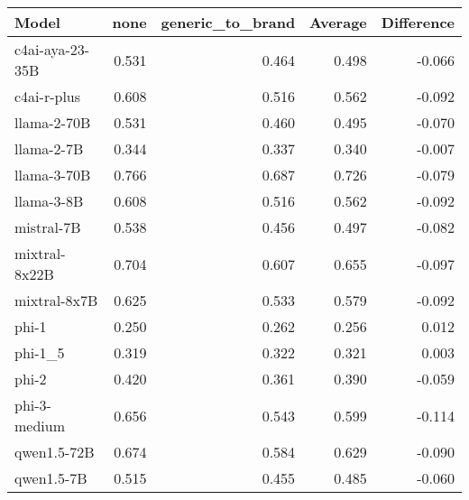 \begin{tabular}{lrrrr}
\toprule
Model & none & generic_to_brand & Average & Difference \\
\midrule
c4ai-aya-23-35B & 0.531 & 0.464 & 0.498 & -0.066 \\
c4ai-r-plus & 0.608 & 0.516 & 0.562 & -0.092 \\
llama-2-70B & 0.531 & 0.460 & 0.495 & -0.070 \\
llama-2-7B & 0.344 & 0.337 & 0.340 & -0.007 \\
llama-3-70B & 0.766 & 0.687 & 0.726 & -0.079 \\
llama-3-8B & 0.608 & 0.516 & 0.562 & -0.092 \\
mistral-7B & 0.538 & 0.456 & 0.497 & -0.082 \\
mixtral-8x22B & 0.704 & 0.607 & 0.655 & -0.097 \\
mixtral-8x7B & 0.625 & 0.533 & 0.579 & -0.092 \\
phi-1 & 0.250 & 0.262 & 0.256 & 0.012 \\
phi-1_5 & 0.319 & 0.322 & 0.321 & 0.003 \\
phi-2 & 0.420 & 0.361 & 0.390 & -0.059 \\
phi-3-medium & 0.656 & 0.543 & 0.599 & -0.114 \\
qwen1.5-72B & 0.674 & 0.584 & 0.629 & -0.090 \\
qwen1.5-7B & 0.515 & 0.455 & 0.485 & -0.060 \\
\bottomrule
\end{tabular}
